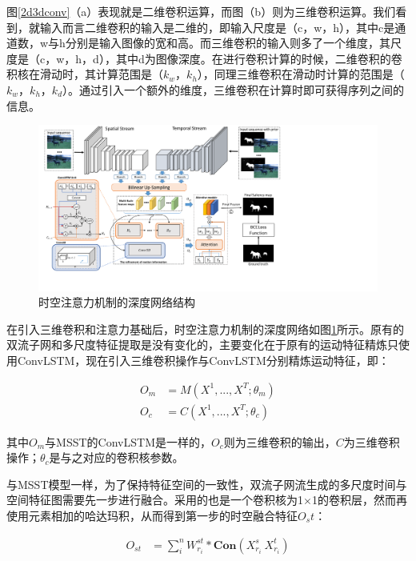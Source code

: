图\ref{2d3dconv}（a）表现就是二维卷积运算，而图（b）则为三维卷积运算。我们看到，就输入而言二维卷积的输入是二维的，即输入尺度是（c，w，h），其中c是通道数，w与h分别是输入图像的宽和高。而三维卷积的输入则多了一个维度，其尺度是（c，w，h，d），其中d为图像深度。在进行卷积计算的时候，二维卷积的卷积核在滑动时，其计算范围是（$k_w$，$k_h$），同理三维卷积在滑动时计算的范围是（$k_w$，$k_h$，$k_d$）。通过引入一个额外的维度，三维卷积在计算时即可获得序列之间的信息。

\begin{figure}
\includegraphics[width=15cm]{figures/stan_framework}
\caption{时空注意力机制的深度网络结构}
\label{stan}
\end{figure}

在引入三维卷积和注意力基础后，时空注意力机制的深度网络如图\ref{stan}所示。原有的双流子网和多尺度特征提取是没有变化的，主要变化在于原有的运动特征精炼只使用ConvLSTM，现在引入三维卷积操作与ConvLSTM分别精炼运动特征，即：

\begin{equation}
\label{P_motion}
\begin{aligned}
   O_{m}  &= M(X^1, ..., X^T; \theta_m) \\
   O_{c}  &= C(X^1, ..., X^T; \theta_c)
 \end{aligned}
\end{equation}

其中$O_{m}$与MSST的ConvLSTM是一样的，$O_{c}$则为三维卷积的输出，$C$为三维卷积操作；$\theta_c$是与之对应的卷积核参数。

与MSST模型一样，为了保持特征空间的一致性，双流子网流生成的多尺度时间与空间特征图需要先一步进行融合。采用的也是一个卷积核为1$\times$1的卷积层，然而再使用元素相加的哈达玛积，从而得到第一步的时空融合特征$O_st$：

\begin{equation}
\label{eq4_2}
\begin{aligned}
   O_{st}  &= \sum_{i}^{n} W^{st}_{r_i} * \textbf{Con}(X^{s}_{r_i} \ X^{t}_{r_i})
 \end{aligned}
\end{equation}

